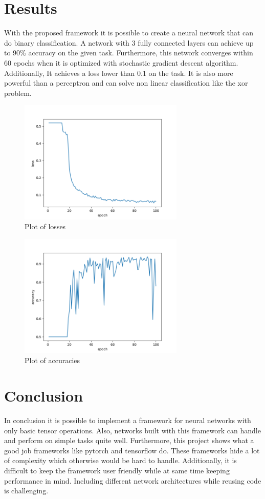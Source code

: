 \documentclass[12pt]{article}
\begin{document}
\section{Results}
With the proposed framework it is possible to create a neural network that can do binary classification.
A network with 3 fully connected layers can achieve up to 90\% accuracy on the given task.
Furthermore, this network converges within 60 epochs when it is optimized with stochastic gradient descent algorithm. 
Additionally, It achieves a loss lower than 0.1 on the task.
It is also more powerful than a perceptron and can solve non linear classification like the xor problem.
\begin{figure}[H]
\centering
\includegraphics[width=0.7\textwidth]{"loss.png"}
\caption{Plot of losses}
\end{figure}
\begin{figure}[H]
\centering
\includegraphics[width=0.7\textwidth]{"acc.png"}
\caption{Plot of accuracies}
\end{figure}

\section{Conclusion}
In conclusion it is possible to implement a framework for neural networks with only basic tensor operations.
Also, networks built with this framework can handle and perform on simple tasks quite well.
Furthermore, this project shows what a good job frameworks like pytorch and tensorflow do.
These frameworks hide a lot of complexity which otherwise would be hard to handle.
Additionally, it is difficult to keep the framework user friendly while at same time keeping performance in mind.
Including different network architectures while reusing code is challenging.
\end{document}
